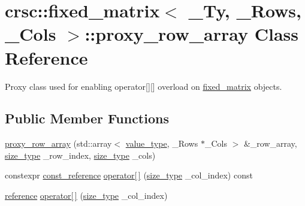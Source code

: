 \hypertarget{classcrsc_1_1fixed__matrix_1_1proxy__row__array}{}\section{crsc\+:\+:fixed\+\_\+matrix$<$ \+\_\+\+Ty, \+\_\+\+Rows, \+\_\+\+Cols $>$\+:\+:proxy\+\_\+row\+\_\+array Class Reference}
\label{classcrsc_1_1fixed__matrix_1_1proxy__row__array}


Proxy class used for enabling operator\mbox{[}\mbox{]}\mbox{[}\mbox{]} overload on \hyperlink{classcrsc_1_1fixed__matrix}{fixed\+\_\+matrix} objects.  


\subsection*{Public Member Functions}
\begin{DoxyCompactItemize}
\item 
\hyperlink{classcrsc_1_1fixed__matrix_1_1proxy__row__array_aabc095261d6b78667f72c979ad426e0e}{proxy\+\_\+row\+\_\+array} (std\+::array$<$ \hyperlink{classcrsc_1_1fixed__matrix_a1d0717197dc43f3752d508763a8b5a9e}{value\+\_\+type}, \+\_\+\+Rows $\ast$\+\_\+\+Cols $>$ \&\+\_\+row\+\_\+array, \hyperlink{classcrsc_1_1fixed__matrix_a4f4ba9cbd0e0723193df4c8281ddd99b}{size\+\_\+type} \+\_\+row\+\_\+index, \hyperlink{classcrsc_1_1fixed__matrix_a4f4ba9cbd0e0723193df4c8281ddd99b}{size\+\_\+type} \+\_\+cols)
\item 
constexpr \hyperlink{classcrsc_1_1fixed__matrix_ac96e937b9ecde6b2700b0865218276c4}{const\+\_\+reference} \hyperlink{classcrsc_1_1fixed__matrix_1_1proxy__row__array_a8bf43a89e9e97e13479ceac2380bcecd}{operator\mbox{[}$\,$\mbox{]}} (\hyperlink{classcrsc_1_1fixed__matrix_a4f4ba9cbd0e0723193df4c8281ddd99b}{size\+\_\+type} \+\_\+col\+\_\+index) const 
\item 
\hyperlink{classcrsc_1_1fixed__matrix_aee0de54210ab3caf2245732d9f79d508}{reference} \hyperlink{classcrsc_1_1fixed__matrix_1_1proxy__row__array_ac0998f5a18cb88e2d66aec7be3c92892}{operator\mbox{[}$\,$\mbox{]}} (\hyperlink{classcrsc_1_1fixed__matrix_a4f4ba9cbd0e0723193df4c8281ddd99b}{size\+\_\+type} \+\_\+col\+\_\+index)
\end{DoxyCompactItemize}

